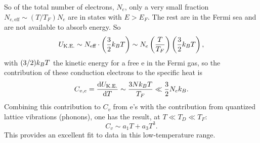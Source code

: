 So of the total number of electrons, $N_e$, only a very small fraction $N_{e,\text{eff}}\sim\left(T/T_F\right)N_e$ are in states with
$E>E_F$. The rest are in the Fermi sea and are not available to absorb energy. So
\begin{equation}
  U_{\text{K.E.}}\sim N_{\text{eff}}\cdot\left(\frac{3}{2}k_{B} T\right)\sim N_e\left(\frac{T}{T_F}\right)\left(\frac{3}{2}k_{B} T\right),
\end{equation}
with $(3/2)k_{B} T$ the kinetic energy for a free e in the Fermi gas, so the contribution of these conduction electrons to the specific
heat is
\begin{equation}
  C_{v,e} = \frac{\mathop{}\!\mathrm{d} U_{\text{K.E.}}}{\mathop{}\!\mathrm{d} T}\sim\frac{3Nk_{B} T}{T_F}\ll\frac{3}{2}N_ek_{B} .
\end{equation}
Combining this contribution to $C_v$ from e's with the contribution from quantized lattice vibrations (phonons), one has the result, at
$T\ll T_D\ll T_F$:
\begin{equation}
  C_v\sim a_1T + a_3T^3 .
\end{equation}
This provides an excellent fit to data in this low-temperature range.
